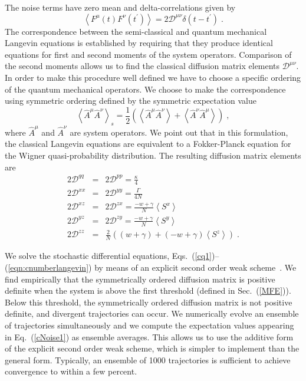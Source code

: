 \documentclass[aps,
twocolumn,
showpacs,
superscriptaddress,groupedaddress]{revtex4}
\begin{document}
The noise terms have zero mean and delta-correlations given by
\begin{equation}
\left< F^{\mu}(t) F^{\nu}(t^{\prime})\right> =
2 \mathscr{D}^{\mu \nu} \delta(t-t^{\prime})\;.
\label{ClassicalDiffusion1}
\end{equation}
The correspondence between the semi-classical and quantum mechanical
Langevin equations is established by requiring that they produce
identical equations for first and second moments of the system
operators.  Comparison of the second moments allows us to find the
classical diffusion matrix elements $\mathscr{D}^{\mu \nu}$.  In order
to make this procedure well defined we have to choose a specific
ordering of the quantum mechanical operators.  We choose to make the
correspondence using symmetric ordering defined by the symmetric
expectation value
\begin{equation}
\left< \hat{A}^{\mu} \hat{A}^{\nu} \right>_s=
\frac{1}{2} \left( \left< \hat{A}^{\mu} \hat{A}^{\nu} \right> + \left<
\hat{A}^{\nu} \hat{A}^{\mu} \right> \right)\;,
\end{equation}
where $\hat{A}^{\mu}$ and $\hat{A}^{\nu}$ are system operators.  We
point out that in this formulation, the classical Langevin equations are
equivalent to a Fokker-Planck equation for the Wigner quasi-probability
distribution. The resulting diffusion matrix elements are
\begin{eqnarray}
  2\mathscr{D}^{q q}&=&
                        2\mathscr{D}^{p p}=
                        \frac{\kappa}{4} \nonumber \\
  2\mathscr{D}^{xx}&=&
                       2\mathscr{D}^{yy}=
                       \frac{\Gamma}{4N} \nonumber \\
  2\mathscr{D}^{xz}&=&
                       2\mathscr{D}^{zx}=
                       \frac{-w+\gamma}{N} \left< S^{x} \right>  
                       \nonumber \\
  2\mathscr{D}^{yz}&=&
                       2\mathscr{D}^{zy}=
                       \frac{-w+\gamma}{N} \left< S^{y} \right>  
                       \nonumber \\
  2\mathscr{D}^{zz}&=&
                       \frac{2}{N}\left((w+\gamma) 
                       + (-w+\gamma)  \left< S^{z} \right> \right)\;.
\label{cNoise1}
\end{eqnarray}

We solve the stochastic differential equations,
Eqs.~(\ref{cq1})--(\ref{eqn:cnumberlangevin}) by means of an explicit
second order weak scheme~\cite{kloeden2011numerical}. We find
empirically that the symmetrically ordered diffusion matrix is positive
definite when the system is above the first threshold (defined in
Sec.~(\ref{MFE})). Below this threshold, the symmetrically ordered
diffusion matrix is not positive definite, and divergent trajectories
can occur. We numerically evolve an ensemble of trajectories
simultaneously and we compute the expectation values appearing in
Eq.~(\ref{cNoise1}) as ensemble averages. This allows us to use the
additive form of the explicit second order weak scheme, which is simpler
to implement than the general form. Typically, an ensemble of 1000
trajectories is sufficient to achieve convergence to within a few
percent.
\end{document}
